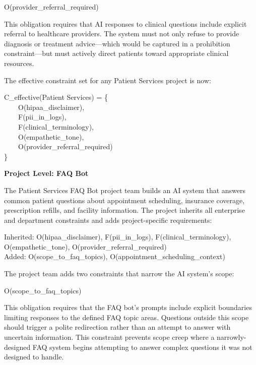 \begin{claddisp}
O(provider\_referral\_required)
\end{claddisp}


This obligation requires that AI responses to clinical questions include explicit referral to healthcare providers. The system must not only refuse to provide diagnosis or treatment advice---which would be captured in a prohibition constraint---but must actively direct patients toward appropriate clinical resources.

The effective constraint set for any Patient Services project is now:

\begin{claddisp}
C\_effective(Patient Services) = \{\\
~~~~O(hipaa\_disclaimer),\\
~~~~F(pii\_in\_logs),\\
~~~~F(clinical\_terminology),\\
~~~~O(empathetic\_tone),\\
~~~~O(provider\_referral\_required)\\
\}
\end{claddisp}


\textbf{Project Level: FAQ Bot}

The Patient Services FAQ Bot project team builds an AI system that answers common patient questions about appointment scheduling, insurance coverage, prescription refills, and facility information. The project inherits all enterprise and department constraints and adds project-specific requirements:

\begin{claddisp}
Inherited: O(hipaa\_disclaimer), F(pii\_in\_logs), F(clinical\_terminology), O(empathetic\_tone), O(provider\_referral\_required)\\
Added: O(scope\_to\_faq\_topics), O(appointment\_scheduling\_context)
\end{claddisp}


The project team adds two constraints that narrow the AI system's scope:

\begin{claddisp}
O(scope\_to\_faq\_topics)
\end{claddisp}


This obligation requires that the FAQ bot's prompts include explicit boundaries limiting responses to the defined FAQ topic areas. Questions outside this scope should trigger a polite redirection rather than an attempt to answer with uncertain information. This constraint prevents scope creep where a narrowly-designed FAQ system begins attempting to answer complex questions it was not designed to handle.

